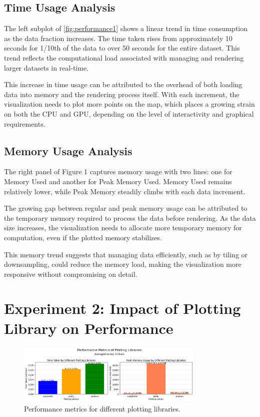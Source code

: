 \subsection{Time Usage Analysis}

The left subplot of \ref{fig:performance1} shows a linear trend in time consumption as the data fraction increases. The time taken rises from approximately 10 seconds for 1/10th of the data to over 50 seconds for the entire dataset. This trend reflects the computational load associated with managing and rendering larger datasets in real-time.

This increase in time usage can be attributed to the overhead of both loading data into memory and the rendering process itself. With each increment, the visualization needs to plot more points on the map, which places a growing strain on both the CPU and GPU, depending on the level of interactivity and graphical requirements.

\subsection{Memory Usage Analysis}

The right panel of Figure 1 captures memory usage with two lines: one for Memory Used and another for Peak Memory Used. Memory Used remains relatively lower, while Peak Memory steadily climbs with each data increment.

The growing gap between regular and peak memory usage can be attributed to the temporary memory required to process the data before rendering. As the data size increases, the visualization needs to allocate more temporary memory for computation, even if the plotted memory stabilizes.

This memory trend suggests that managing data efficiently, such as by tiling or downsampling, could reduce the memory load, making the visualization more responsive without compromising on detail.

\section{Experiment 2: Impact of Plotting Library on Performance}

\begin{figure}[H]
    \centering
    \includegraphics[width=0.8\textwidth]{figures/barplot_performance.png}
    \caption{Performance metrics for different plotting libraries.}
    \label{fig:performance2}
\end{figure}

